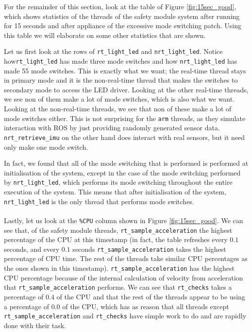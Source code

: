 \documentclass[12pt]{scrreprt}
\begin{document}
For the remainder of this section, look at the table of Figure \ref{fig:15sec_good}, which shows statistics of the threads of the safety module system after running for 15 seconds and after appliance of the excessive mode switching patch. Using this table we will elaborate on some other statistics that are shown.  
\par
Let us first look at the rows of \texttt{rt\_light\_led} and \texttt{nrt\_light\_led}. Notice how\newline\texttt{rt\_light\_led} has made three mode switches and how \texttt{nrt\_light\_led} has made 55 mode switches. This is exactly what we want; the real-time thread stays in primary mode and it is the non-real-time thread that makes the switches to secondary mode to access the LED driver. Looking at the other real-time threads, we see non of them make a lot of mode switches, which is also what we want. Looking at the non-real-time threads, we see that non of these make a lot of mode switches either. This is not surprising for the \texttt{arm} threads, as they simulate interaction with ROS by just providing randomly generated sensor data. \texttt{nrt\_retrieve\_imu} on the other hand does interact with real sensors, but it need only make one mode switch.
\par
In fact, we found that all of the mode switching that is performed is performed at initialisation of the system, except in the case of the mode switching performed by \texttt{nrt\_light\_led}, which performs its mode switching throughout the entire execution of the system. This means that after initialisation of the system, \texttt{nrt\_light\_led} is the only thread that performs mode switches.
\\\\
Lastly, let us look at the \texttt{\%CPU} column shown in Figure \ref{fig:15sec_good}. We can see that, of the safety module threads, \texttt{rt\_sample\_acceleration} the highest percentage of the CPU at this timestamp (in fact, the table refreshes every $0.1$ seconds, and every $0.1$ seconds \texttt{rt\_sample\_acceleration} takes the highest percentage of CPU time. The rest of the threads take similar CPU percentages as the ones shown in this timestamp). \texttt{rt\_sample\_acceleration} has the highest CPU percentage  because of the internal calculation of velocity from acceleration that \texttt{rt\_sample\_acceleration} performs. We can see that \texttt{rt\_checks} takes a percentage of $0.4$ of the CPU and that the rest of the threads appear to be using a percentage of $0.0$ of the CPU, which has as reason that all threads except \texttt{rt\_sample\_acceleration} and \texttt{rt\_checks} have simple work to do and are rapidly done with their task. 
\end{document}

